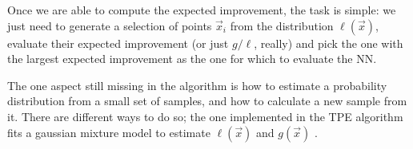 \documentclass[main.tex]{subfiles}
\begin{document}
Once we are able to compute the expected improvement, the task is simple: we just need to generate a selection of points \(\vec{x}_i\) from the distribution \(\ell (\vec{x})\), evaluate their expected improvement (or just \(g/\ell\), really) and pick the one with the largest expected improvement as the one for which to evaluate the \ac{NN}. 

The one aspect still missing in the algorithm is how to estimate a probability distribution from a small set of samples, and how to calculate a new sample from it. 
There are different ways to do so; the one implemented in the \ac{TPE} algorithm fits a gaussian mixture model to estimate \(\ell(\vec{x})\) and \(g(\vec{x})\) \cite[section 5]{bergstraMakingScienceModel2013}. 
\end{document}
